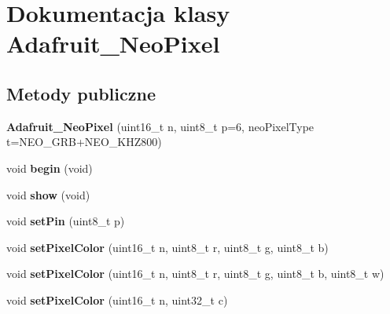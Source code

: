 \hypertarget{class_adafruit___neo_pixel}{}\section{Dokumentacja klasy Adafruit\+\_\+\+Neo\+Pixel}
\label{class_adafruit___neo_pixel}
\subsection*{Metody publiczne}
\begin{DoxyCompactItemize}
\item 
\mbox{\label{class_adafruit___neo_pixel_ac72ba50fa350f089a31fc4c634c79bcb}} 
{\bfseries Adafruit\+\_\+\+Neo\+Pixel} (uint16\+\_\+t n, uint8\+\_\+t p=6, neo\+Pixel\+Type t=N\+E\+O\+\_\+\+G\+RB+N\+E\+O\+\_\+\+K\+H\+Z800)
\item 
\mbox{\label{class_adafruit___neo_pixel_ac1cb16509be644232ce0e28d250083da}} 
void {\bfseries begin} (void)
\item 
\mbox{\label{class_adafruit___neo_pixel_a4bcda7a15591065570d3598cbf970be7}} 
void {\bfseries show} (void)
\item 
\mbox{\label{class_adafruit___neo_pixel_a64a6704fdac239046791e7a9f7a76ab6}} 
void {\bfseries set\+Pin} (uint8\+\_\+t p)
\item 
\mbox{\label{class_adafruit___neo_pixel_ab8763ccc6f9a090df1f753905fd5561e}} 
void {\bfseries set\+Pixel\+Color} (uint16\+\_\+t n, uint8\+\_\+t r, uint8\+\_\+t g, uint8\+\_\+t b)
\item 
\mbox{\label{class_adafruit___neo_pixel_ac7b3529b3d190f3af5d8e5b9ead27688}} 
void {\bfseries set\+Pixel\+Color} (uint16\+\_\+t n, uint8\+\_\+t r, uint8\+\_\+t g, uint8\+\_\+t b, uint8\+\_\+t w)
\item 
\mbox{\label{class_adafruit___neo_pixel_a19fc274330c0e65907929ee03b93b1c3}} 
void {\bfseries set\+Pixel\+Color} (uint16\+\_\+t n, uint32\+\_\+t c)
\item 
\mbox{\label{class_adafruit___neo_pixel_aa05f7d37828c43fef00e6242dcf75959}} 

\end{DoxyCompactItemize}
